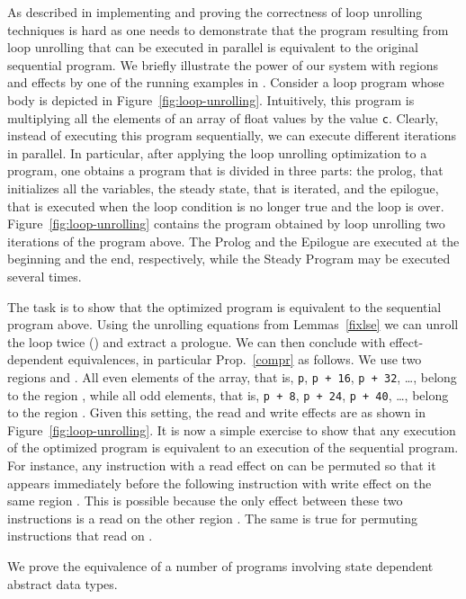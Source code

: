 \documentclass[orivec]{llncs}
\makeatletter
\renewcommand\subsection{\@startsection{subsection}{2}{\z@}{-2\p@ \@plus -4\p@ \@minus -4\p@}{-0.5em \@plus -0.22em \@minus -0.1em}{\normalfont\normalsize\bfseries}}
\makeatother
\begin{document}
As described in \cite{tristan10popl} implementing and proving the
correctness of loop unrolling techniques is hard as
one needs to demonstrate that the program resulting from loop unrolling
that can be executed in parallel is equivalent to the original sequential
program. We briefly illustrate the power of our system with regions and
effects by one of the running examples in \cite{tristan10popl}. Consider
a loop program whose body is depicted in Figure~\ref{fig:loop-unrolling}.
Intuitively, this program is multiplying all the elements of an array of 
float values by the value \texttt{c}. Clearly, instead of executing this
program sequentially, we can execute different iterations in parallel. 
In particular, after applying the loop unrolling optimization to a program,
one obtains a program that is divided in three parts: the prolog, that
initializes all the variables, the steady state, that is iterated, and the
epilogue, that is executed when the loop condition is no longer true and
the loop is over. Figure~\ref{fig:loop-unrolling} contains the program
obtained by loop unrolling two iterations of the program above. The Prolog
and the Epilogue are executed at the beginning and the end, respectively,
while the Steady Program may be executed several times. 

The task is to show that the optimized program is equivalent to the
sequential program above. Using the unrolling equations from
Lemmas~\ref{fixlse} we can unroll the loop twice
() and extract a prologue. We can then conclude with
effect-dependent equivalences, in particular Prop.~\ref{compr} as
follows. We use two regions 
and . All even elements of the array, that is, \texttt{p},
\texttt{p + 16}, \texttt{p + 32}, \ldots, belong to the region ,
while all odd elements, that is, \texttt{p + 8},
\texttt{p + 24}, \texttt{p + 40}, \ldots, belong to the region .
Given this setting, the read and write effects are as shown in
Figure~\ref{fig:loop-unrolling}. It is now a simple exercise to show that
any execution of the optimized program is equivalent to an execution of
the sequential program. For instance, any instruction with a read effect 
on  can be permuted so that it appears immediately before the
following instruction with write effect  on the same region
. This is possible because the only effect between these two
instructions is a read on the other region . The same is true
for permuting instructions that read on . 

\fi
\subsection{State Dependent Abstract Data Types (ADT)}
We prove the equivalence of a number of programs involving state dependent
abstract data types. 
\end{document}
